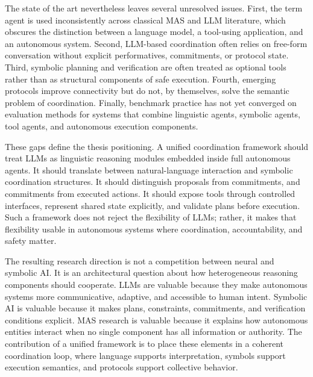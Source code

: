 The state of the art nevertheless leaves several unresolved issues. First, the term agent is used inconsistently across classical MAS and LLM literature, which obscures the distinction between a language model, a tool-using application, and an autonomous system. Second, LLM-based coordination often relies on free-form conversation without explicit performatives, commitments, or protocol state. Third, symbolic planning and verification are often treated as optional tools rather than as structural components of safe execution. Fourth, emerging protocols improve connectivity but do not, by themselves, solve the semantic problem of coordination. Finally, benchmark practice has not yet converged on evaluation methods for systems that combine linguistic agents, symbolic agents, tool agents, and autonomous execution components.

These gaps define the thesis positioning. A unified coordination framework should treat LLMs as linguistic reasoning modules embedded inside full autonomous agents. It should translate between natural-language interaction and symbolic coordination structures. It should distinguish proposals from commitments, and commitments from executed actions. It should expose tools through controlled interfaces, represent shared state explicitly, and validate plans before execution. Such a framework does not reject the flexibility of LLMs; rather, it makes that flexibility usable in autonomous systems where coordination, accountability, and safety matter.

The resulting research direction is not a competition between neural and symbolic AI. It is an architectural question about how heterogeneous reasoning components should cooperate. LLMs are valuable because they make autonomous systems more communicative, adaptive, and accessible to human intent. Symbolic AI is valuable because it makes plans, constraints, commitments, and verification conditions explicit. MAS research is valuable because it explains how autonomous entities interact when no single component has all information or authority. The contribution of a unified framework is to place these elements in a coherent coordination loop, where language supports interpretation, symbols support execution semantics, and protocols support collective behavior.
